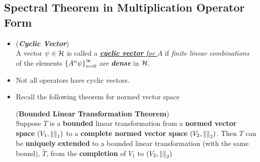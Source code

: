 \documentclass[11pt]{article}
\begin{document}
\subsection{Spectral Theorem in Multiplication Operator Form}
\begin{itemize}
\item \begin{definition} (\emph{\textbf{Cyclic Vector}})\\
A vector $\psi \in {\mathcal H}$ is called a \emph{\underline{\textbf{cyclic vector} for $A$}} if \emph{finite linear combinations} of the elements $\left\{A^{n}\psi\right\}_{n=0}^{\infty}$ are \emph{\textbf{dense}} in ${\mathcal H}$. 
\end{definition}

\item \begin{remark}
Not all operators have cyclic vectors.
\end{remark}

\item Recall the following theorem for normed vector space
\begin{theorem} (\textbf{Bounded Linear Transformation Theorem}) \citep{reed1980methods}\\
Suppose $T$ is a \textbf{bounded} linear transformation from a \textbf{normed vector space} $(V_1, \left\|\right\|_{1})$ to a \textbf{complete normed vector space} $(V_2, \left\|\right\|_{2})$. Then $T$ can be \textbf{uniquely} \textbf{extended} to a bounded linear transformation (with the same bound), $\widetilde{T}$, from the \textbf{completion} of $V_1$ to $(V_2,\left\|\right\|_{2})$
\end{theorem}



\end{itemize}
\end{document}
